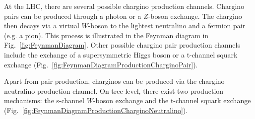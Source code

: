 At the LHC, there are several possible chargino production channels. 
Chargino pairs can be produced through a photon or a $Z$-boson exchange. 
The chargino then decays via a virtual $W$-boson to the lightest neutralino and a fermion pair (e.g. a pion). 
This process is illustrated in the Feynman diagram in Fig.~\ref{fig:FeynmanDiagram}.
Other possible chargino pair production channels include the exchange of a supersymmetric Higgs boson or a t-channel squark exchange (Fig.~\ref{fig:FeynmanDiagramProductionCharginoPair}).

Apart from pair production, charginos can be produced via the chargino neutralino production channel. 
On tree-level, there exist two production mechanisms: the s-channel $W$-boson exchange and the t-channel squark exchange (Fig.~\ref{fig:FeynmanDiagramProductionCharginoNeutralino}).


